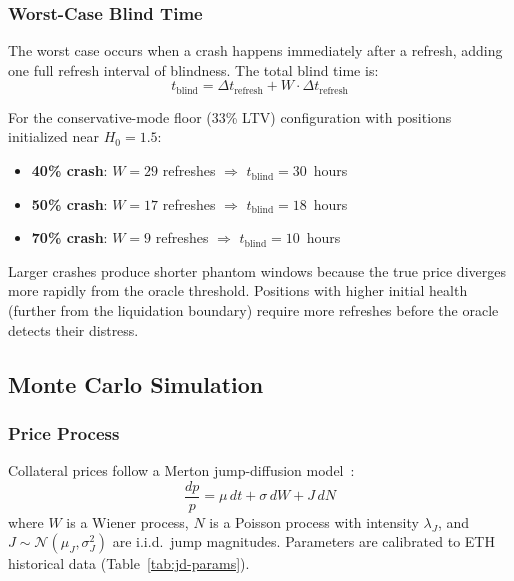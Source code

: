 \documentclass[10pt,a4paper,twocolumn]{article}
\begin{document}
\subsubsection{Worst-Case Blind Time}
\label{subsec:bd-blind}

The worst case occurs when a crash happens immediately after a refresh, adding one full refresh interval of blindness. The total blind time is:
\begin{equation}
\label{eq:blind-time}
t_{\text{blind}} = \Delta t_{\text{refresh}} + W \cdot \Delta t_{\text{refresh}}
\end{equation}

For the conservative-mode floor (33\% LTV) configuration with positions initialized near $H_0 = 1.5$:
\begin{itemize}[leftmargin=*]
\item \textbf{40\% crash}: $W = 29$ refreshes $\Rightarrow$ $t_{\text{blind}} = 30$~hours
\item \textbf{50\% crash}: $W = 17$ refreshes $\Rightarrow$ $t_{\text{blind}} = 18$~hours
\item \textbf{70\% crash}: $W = 9$ refreshes $\Rightarrow$ $t_{\text{blind}} = 10$~hours
\end{itemize}

\noindent Larger crashes produce shorter phantom windows because the true price diverges more rapidly from the oracle threshold. Positions with higher initial health (further from the liquidation boundary) require more refreshes before the oracle detects their distress.

\subsection{Monte Carlo Simulation}
\label{sec:bd-montecarlo}

\subsubsection{Price Process}
\label{subsec:bd-price}

Collateral prices follow a Merton jump-diffusion model~\cite{merton1976}:
\begin{equation}
\label{eq:jump-diffusion}
\frac{dp}{p} = \mu\,dt + \sigma\,dW + J\,dN
\end{equation}
where $W$ is a Wiener process, $N$ is a Poisson process with intensity $\lambda_J$, and $J \sim \mathcal{N}(\mu_J, \sigma_J^2)$ are i.i.d.\ jump magnitudes. Parameters are calibrated to ETH historical data (Table~\ref{tab:jd-params}).
\end{document}
